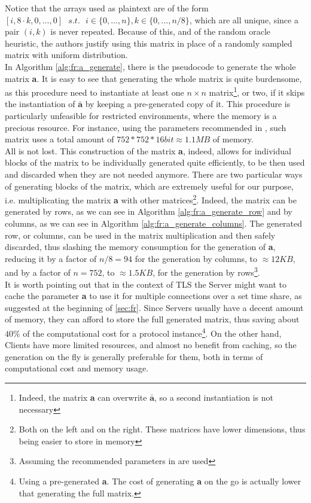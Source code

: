 Notice that the arrays used as plaintext are of the form $[i,8\cdot k,0,\dots,0]\text{ }s.t.\text{ }i\in\{0,\dots,n\},k\in\{0,\dots,n/8\}$, which are all unique, since a pair $(i,k)$ is never repeated. Because of this, and of the random oracle heuristic, the authors justify using this matrix in place of a randomly sampled matrix with uniform distribution.\\
In Algorithm \ref{alg:fr:a_generate}, there is the pseudocode to generate the whole matrix \textbf{a}. It is easy to see that generating the whole matrix is quite burdensome, as this procedure need to instantiate at least one $n\times n$ matrix\footnote{Indeed, the matrix \textbf{a} can overwrite $\bar{\textbf{a}}$, so a second instantiation is not necessary}, or two, if it skips the instantiation of $\bar{\textbf{a}}$ by keeping a pre-generated copy of it. This procedure is particularly unfeasible for restricted environments, where the memory is a precious resource. For instance, using the parameters recommended in \cite{frodo}, such matrix uses a total amount of $752*752*16bit\approx1.1MB$ of memory.\\
All is not lost. This construction of the matrix \textbf{a}, indeed, allows for individual blocks of the matrix to be individually generated quite efficiently, to be then used and discarded when they are not needed anymore. There are two particular ways of generating blocks of the matrix, which are extremely useful for our purpose, i.e. multiplicating the matrix \textbf{a} with other matrices\footnote{Both on the left and on the right. These matrices have lower dimensions, thus being easier to store in memory}. Indeed, the matrix can be generated by rows, as we can see in Algorithm \ref{alg:fr:a_generate_row} and by columns, as we can see in Algorithm \ref{alg:fr:a_generate_columns}. The generated row, or columns, can be used in the matrix multiplication and then safely discarded, thus slashing the memory consumption for the generation of \textbf{a}, reducing it by a factor of $n/8=94$ for the generation by columns, to $\approx 12KB$, and by a factor of $n=752$, to $\approx 1.5KB$, for the generation by rows\footnote{Assuming the recommended parameters in \cite{frodo} are used}.\\
It is worth pointing out that in the context of TLS the Server might want to cache the parameter \textbf{a} to use it for multiple connections over a set time share, as suggested at the beginning of \ref{sec:fr}. Since Servers usually have a decent amount of memory, they can afford to store the full generated matrix, thus saving about $40\%$ of the computational cost for a protocol instance\footnote{Using a pre-generated \textbf{a}. The cost of generating \textbf{a} on the go is actually lower that generating the full matrix.}. On the other hand, Clients have more limited resources, and almost no benefit from caching, so the generation on the fly is generally preferable for them, both in terms of computational cost and memory usage.

